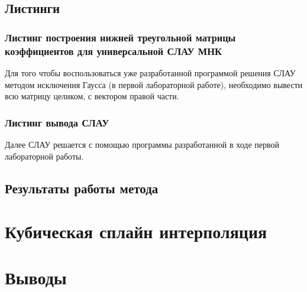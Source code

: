 \documentclass[a4paper]{article}
\begin{document}
\subsection{Листинги}
\subsubsection{Листинг построения нижней треугольной матрицы коэффициентов для универсальной СЛАУ МНК}


Для того чтобы воспользоваться уже разработанной программой решения СЛАУ методом исключения Гаусса (в первой лабораторной работе), необходимо вывести всю матрицу целиком, с вектором правой части.

\subsubsection{Листинг вывода СЛАУ}


Далее СЛАУ решается с помощью программы разработанной в ходе первой лабораторной работы.

\subsection{Результаты работы метода}

\section{Кубическая сплайн интерполяция}

\section{Выводы}
\end{document}
